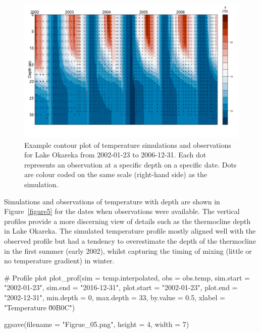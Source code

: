 \begin{figure}[htbp]
    \centering
    \includegraphics[scale=0.33]{Figure4.png}
    \caption{Example contour plot of temperature simulations and observations for Lake Okareka from 2002-01-23 to 2006-12-31. Each dot represents an observation at a specific depth on a specific date. Dots are colour coded on the same scale (right-hand side) as the simulation.}
    \label{figure4}
\end{figure}

\newpage

Simulations and observations of temperature with depth are shown in Figure~\ref{figure5} for the dates when observations were available. The vertical profiles provide a more discerning view of details such as the thermocline depth in Lake Okareka. The simulated temperature profile mostly aligned well with the observed profile but had a tendency to overestimate the depth of the thermocline in the first summer (early 2002), whilst capturing the timing of mixing (little or no temperature gradient) in winter.\par

\begin{example}
    # Profile plot
    plot_prof(sim = temp.interpolated,
              obs = obs.temp,
              sim.start = "2002-01-23",
              sim.end = "2016-12-31",
              plot.start = "2002-01-23",
              plot.end = "2002-12-31",
              min.depth = 0,
              max.depth = 33,
              by.value = 0.5,
              xlabel = "Temperature \u00B0C")
              
   ggsave(filename = "Figrue_05.png", height = 4, width = 7)

\end{example}

